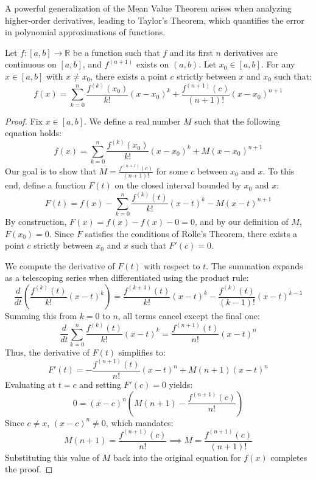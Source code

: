 A powerful generalization of the Mean Value Theorem arises when analyzing higher-order derivatives, leading to Taylor's Theorem, which quantifies the error in polynomial approximations of functions.

\begin{theorem}
Let $f: [a, b] \to \mathbb{R}$ be a function such that $f$ and its first $n$ derivatives are continuous on $[a, b]$, and $f^{(n+1)}$ exists on $(a, b)$. Let $x_0 \in [a, b]$. For any $x \in [a, b]$ with $x \neq x_0$, there exists a point $c$ strictly between $x$ and $x_0$ such that:
\[
f(x) = \sum_{k=0}^n \frac{f^{(k)}(x_0)}{k!}(x - x_0)^k + \frac{f^{(n+1)}(c)}{(n+1)!}(x - x_0)^{n+1}
\]
\end{theorem}

\begin{proof}
Fix $x \in [a, b]$. We define a real number $M$ such that the following equation holds:
\[
f(x) = \sum_{k=0}^n \frac{f^{(k)}(x_0)}{k!}(x - x_0)^k + M(x - x_0)^{n+1}
\]
Our goal is to show that $M = \frac{f^{(n+1)}(c)}{(n+1)!}$ for some $c$ between $x_0$ and $x$. To this end, define a function $F(t)$ on the closed interval bounded by $x_0$ and $x$:
\[
F(t) = f(x) - \sum_{k=0}^n \frac{f^{(k)}(t)}{k!}(x - t)^k - M(x - t)^{n+1}
\]
By construction, $F(x) = f(x) - f(x) - 0 = 0$, and by our definition of $M$, $F(x_0) = 0$. Since $F$ satisfies the conditions of Rolle's Theorem, there exists a point $c$ strictly between $x_0$ and $x$ such that $F'(c) = 0$. 

We compute the derivative of $F(t)$ with respect to $t$. The summation expands as a telescoping series when differentiated using the product rule:
\[
\frac{d}{dt} \left( \frac{f^{(k)}(t)}{k!}(x - t)^k \right) = \frac{f^{(k+1)}(t)}{k!}(x - t)^k - \frac{f^{(k)}(t)}{(k-1)!}(x - t)^{k-1}
\]
Summing this from $k=0$ to $n$, all terms cancel except the final one:
\[
\frac{d}{dt} \sum_{k=0}^n \frac{f^{(k)}(t)}{k!}(x - t)^k = \frac{f^{(n+1)}(t)}{n!}(x - t)^n
\]
Thus, the derivative of $F(t)$ simplifies to:
\[
F'(t) = - \frac{f^{(n+1)}(t)}{n!}(x - t)^n + M(n+1)(x - t)^n
\]
Evaluating at $t = c$ and setting $F'(c) = 0$ yields:
\[
0 = (x - c)^n \left( M(n+1) - \frac{f^{(n+1)}(c)}{n!} \right)
\]
Since $c \neq x$, $(x - c)^n \neq 0$, which mandates:
\[
M(n+1) = \frac{f^{(n+1)}(c)}{n!} \implies M = \frac{f^{(n+1)}(c)}{(n+1)!}
\]
Substituting this value of $M$ back into the original equation for $f(x)$ completes the proof.
\end{proof}
